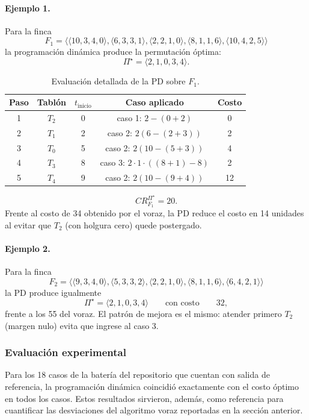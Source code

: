 \documentclass[12pt,a4paper]{article}
\begin{document}
\paragraph{Ejemplo 1.}
Para la finca
\[
F_1=\langle\langle 10,3,4,0\rangle,\langle 6,3,3,1\rangle,\langle 2,2,1,0\rangle,\langle 8,1,1,6\rangle,\langle 10,4,2,5\rangle\rangle
\]
la programaci\'on din\'amica produce la permutaci\'on \'optima:
\[
\Pi^\star=\langle 2,1,0,3,4\rangle.
\]

\begin{table}[ht]
  \centering
  \small
  \begin{tabular}{ccccc}
    \toprule
    Paso & Tabl\'on & \(t_{\text{inicio}}\) & Caso aplicado & Costo \\
    \midrule
    1 & \(T_2\) & 0 & caso 1: \(2-(0+2)\) & 0 \\
    2 & \(T_1\) & 2 & caso 2: \(2(6-(2+3))\) & 2 \\
    3 & \(T_0\) & 5 & caso 2: \(2(10-(5+3))\) & 4 \\
    4 & \(T_3\) & 8 & caso 3: \(2\cdot1\cdot((8+1)-8)\) & 2 \\
    5 & \(T_4\) & 9 & caso 2: \(2(10-(9+4))\) & 12 \\
    \bottomrule
  \end{tabular}
  \caption{Evaluaci\'on detallada de la PD sobre \(F_1\).}
\end{table}

\[
CR_{F_1}^{\Pi^\star}=20.
\]
Frente al costo de 34 obtenido por el voraz, la PD reduce el costo en 14 unidades al evitar que \(T_2\) (con holgura cero) quede postergado.

\paragraph{Ejemplo 2.}
Para la finca
\[
F_2=\langle\langle 9,3,4,0\rangle,\langle 5,3,3,2\rangle,\langle 2,2,1,0\rangle,\langle 8,1,1,6\rangle,\langle 6,4,2,1\rangle\rangle
\]
la PD produce igualmente
\[
\Pi^\star=\langle 2,1,0,3,4\rangle
\qquad\text{con costo}\qquad
32,
\]
frente a los 55 del voraz. El patr\'on de mejora es el mismo: atender primero \(T_2\) (margen nulo) evita que ingrese al caso 3.

\subsubsection{Evaluaci\'on experimental}

Para los 18 casos de la bater\'ia del repositorio que cuentan con salida de referencia, la programaci\'on din\'amica coincidi\'o exactamente con el costo \'optimo en todos los casos. Estos resultados sirvieron, adem\'as, como referencia para cuantificar las desviaciones del algoritmo voraz reportadas en la secci\'on anterior.
\end{document}
